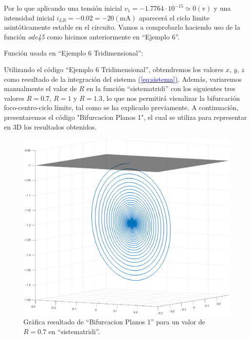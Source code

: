 \documentclass[12pt,a4paper]{report} %
\newcommand{\eref}[1]{\hyperref[#1]{\textcolor{blue}{(\ref*{#1})}}}
\newcommand{\eref}[1]{\hyperref[#1]{\textcolor{blue}{\textit{(\ref*{#1})}}}}
\begin{document}
	\vspace{0.4cm}\noindent Por lo que aplicando una tensión inicial $v_1=-1.7764\cdotp 10^{-15} \simeq 0 (\text{v})$ y una intensidad inicial $i_{LR}=-0.02=-20(\text{mA})$ aparecerá el ciclo limite asintóticamente estable en el circuito. Vamos a comprobarlo haciendo uso de la función \textit{ode45} como hicimos anteriormente en ``Ejemplo 6''.
	
	\vspace{0.5cm}
	
	\vspace{0.5cm}\noindent Función usada en ``Ejemplo 6 Tridimensional'':
	\vspace{0.5cm}
	
	\newpage
	
	 Utilizando el código ``Ejemplo 6 Tridimensional'', obtendremos los valores $x$, $y$, $z$ como resultado de la integración del sistema \eref{eq:sistema}. Además, variaremos manualmente el valor de $R$ en la función ``sistematridi'' con los siguientes tres valores $R=0.7$, $R=1$ y $R=1.3$, lo que nos permitirá visualizar la bifurcación foco-centro-ciclo límite, tal como se ha explicado previamente. A continuación, presentaremos el código "Bifurcacion Planos 1", el cual se utiliza para representar en 3D los resultados obtenidos.
	
	\vspace{0.5cm}
	
	\newpage
	
	\begin{figure}[h]
		\centering
		\includegraphics[width=1\textwidth]{fococir.eps}
		\caption{Gráfica resultado de ``Bifurcacion Planos 1'' para un valor de $R=0.7$ en ``sistematridi''.}
		\label{fig:fococircuito}
	\end{figure}\smallskip
	
\end{document}
